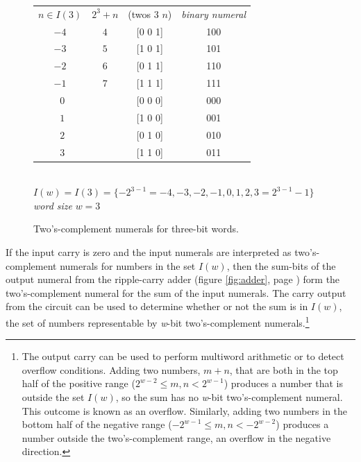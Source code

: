 \begin{figure}
\begin{tabular}{cccc}
 $n \in I(3)$ & $2^3+n$  & \textsf{(twos $3$ $n$)}   & \emph{binary numeral} \\
 $-4$         & $4$      & \textsf{[0 0 1]}          & 100                   \\
 $-3$         & $5$      & \textsf{[1 0 1]}          & 101                   \\
 $-2$         & $6$      & \textsf{[0 1 1]}          & 110                   \\
 $-1$         & $7$      & \textsf{[1 1 1]}          & 111                   \\
 $~~0$        &          & \textsf{[0 0 0]}          & 000                   \\
 $~~1$        &          & \textsf{[1 0 0]}          & 001                   \\
 $~~2$        &          & \textsf{[0 1 0]}          & 010                   \\
 $~~3$        &          & \textsf{[1 1 0]}          & 011                   \\
\end{tabular}
\\ $I(w) = I(3) = \{-2^{3-1}=-4, -3, -2, -1, 0, 1, 2, 3=2^{3-1}-1\}$
\\ \emph{word size} $w = 3$
\caption{Two's-complement numerals for three-bit words.}
\label{fig:2s-comp-3bit}
\end{figure}

If the input carry is zero and
the input numerals are interpreted
as two's-complement numerals for numbers in the set $I(w)$,
then the sum-bits of the output numeral from the ripple-carry adder
(figure \ref{fig:adder}, page \pageref{fig:adder})
form the two's-complement numeral for the sum of the input numerals.
The carry output from the circuit can be used to determine
whether or not the sum is in $I(w)$, the set of numbers representable
by \emph{w}-bit two's-complement numerals.\footnote{The
output carry can be used to perform multiword arithmetic
or to detect overflow conditions. Adding two numbers, $m+n$,
that are both in the top half of the positive range
($2^{w-2} \leq m, n < 2^{w-1}$) produces a number that is
outside the set $I(w)$, so the sum has no \emph{w}-bit two's-complement numeral.
This outcome is known as an overflow.
Similarly, adding two numbers in the bottom half of the
negative range ($-2^{w-1} \leq m,n < -2^{w-2}$)
produces a number outside the two's-complement range, an overflow in the negative direction.}

